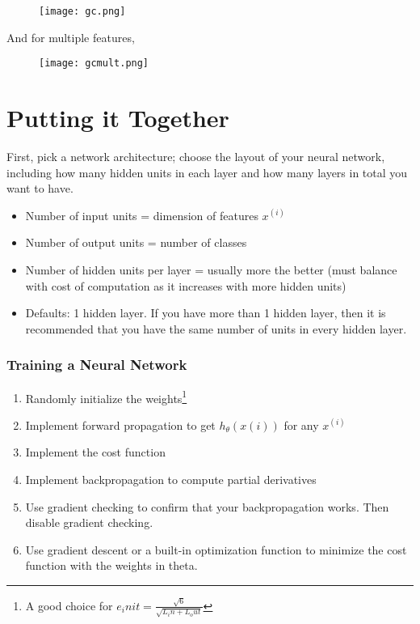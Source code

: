     \begin{figure}[h]
      \texttt{[image: gc.png]}
    \end{figure}

    And for multiple features,

    \begin{figure}[h]
      \texttt{[image: gcmult.png]}
    \end{figure}

  \section{Putting it Together}
    First, pick a network architecture; choose the layout of your neural network, including how many hidden units in each layer and how many layers in total you want to have.

    \begin{itemize}
      \item Number of input units = dimension of features $x^{(i)}$
      \item Number of output units = number of classes
      \item Number of hidden units per layer = usually more the better (must balance with cost of computation as it increases with more hidden units)
      \item Defaults: 1 hidden layer. If you have more than 1 hidden layer, then it is recommended that you have the same number of units in every hidden layer.
    \end{itemize}

    \subsubsection{Training a Neural Network}
      \begin{enumerate}
        \item Randomly initialize the weights\footnote[3]{A good choice for $e_init = \frac{\sqrt{6}}{\sqrt{L_in + L_out}}$}
        \item Implement forward propagation to get $h_\theta(x(i))$ for any $x^{(i)}$
        \item Implement the cost function
        \item Implement backpropagation to compute partial derivatives
        \item Use gradient checking to confirm that your backpropagation works. Then disable gradient checking.
        \item Use gradient descent or a built-in optimization function to minimize the cost function with the weights in theta.
      \end{enumerate}
